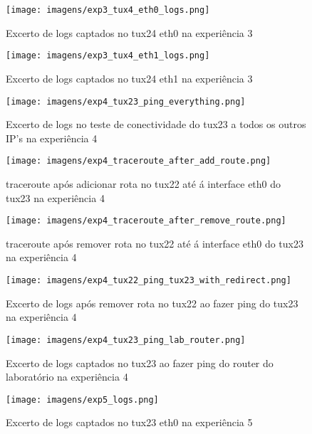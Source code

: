\begin{figure}[h!]
\centering
\texttt{[image: imagens/exp3\_tux4\_eth0\_logs.png]}
\caption{Excerto de logs captados no tux24 eth0 na experiência 3}
\label{fig:exp3_tux4_eth0_logs}
\end{figure}

\begin{figure}[h!]
\centering
\texttt{[image: imagens/exp3\_tux4\_eth1\_logs.png]}
\caption{Excerto de logs captados no tux24 eth1 na experiência 3}
\label{fig:exp3_tux4_eth1_logs}
\end{figure}

\begin{figure}[h!]
\centering
\texttt{[image: imagens/exp4\_tux23\_ping\_everything.png]}
\caption{Excerto de logs no teste de conectividade do tux23 a todos os outros IP's na experiência 4}
\label{fig:exp4_tux23_ping_evertything}
\end{figure}

\begin{figure}[h!]
\centering
\texttt{[image: imagens/exp4\_traceroute\_after\_add\_route.png]}
\caption{traceroute após adicionar rota no tux22 até á interface eth0 do tux23 na experiência 4}
\label{fig:exp4_traceroute_after_add_route}
\end{figure}

\begin{figure}[h!]
\centering
\texttt{[image: imagens/exp4\_traceroute\_after\_remove\_route.png]}
\caption{traceroute após remover rota no tux22 até á interface eth0 do tux23 na experiência 4}
\label{fig:exp4_traceroute_after_remove_route}
\end{figure}

\begin{figure}[h!]
\centering
\texttt{[image: imagens/exp4\_tux22\_ping\_tux23\_with\_redirect.png]}
\caption{Excerto de logs após remover rota no tux22 ao fazer ping do tux23 na experiência 4}
\label{fig:exp4_tux22_ping_tux23_with_redirect}
\end{figure}

\begin{figure}[h!]
\centering
\texttt{[image: imagens/exp4\_tux23\_ping\_lab\_router.png]}
\caption{Excerto de logs captados no tux23 ao fazer ping do router do laboratório na experiência 4}
\label{fig:exp4_tux23_ping_lab_router}
\end{figure}

\begin{figure}[h!]
\centering
\texttt{[image: imagens/exp5\_logs.png]}
\caption{Excerto de logs captados no tux23 eth0 na experiência 5}
\label{fig:exp5_logs}
\end{figure}

